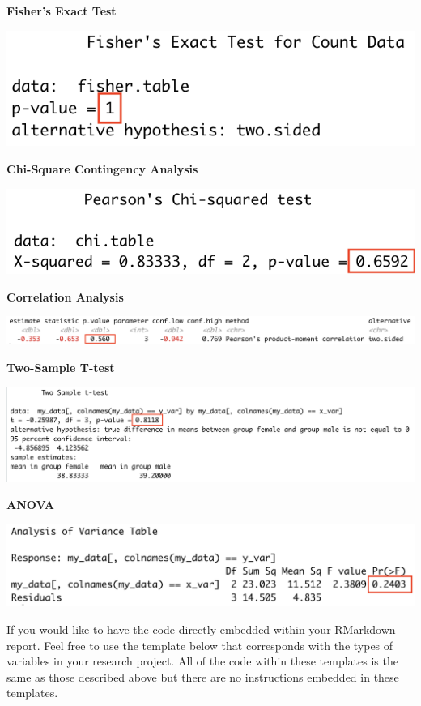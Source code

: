 \documentclass[
]{book}
\begin{document}
\textbf{Fisher's Exact Test}

\includegraphics{images/fishers_example.png}

\textbf{Chi-Square Contingency Analysis}

\includegraphics{images/chi-square_example.png}

\textbf{Correlation Analysis}

\includegraphics{images/correlation_example.png}

\textbf{Two-Sample T-test}

\includegraphics{images/t-test_example.png}

\textbf{ANOVA}

\includegraphics{images/anova_example.png}

If you would like to have the code directly embedded within your RMarkdown report. Feel free to use the template below that corresponds with the types of variables in your research project. All of the code within these templates is the same as those described above but there are no instructions embedded in these templates.
\end{document}
